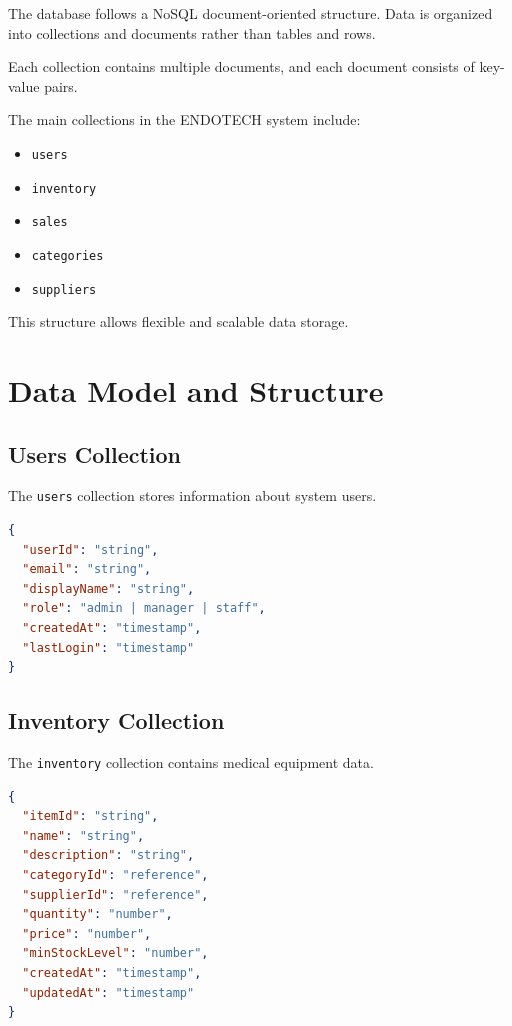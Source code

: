The database follows a NoSQL document-oriented structure. Data is organized into collections and documents rather than tables and rows.

Each collection contains multiple documents, and each document consists of key-value pairs.

The main collections in the ENDOTECH system include:

\begin{itemize}
    \item \texttt{users}
    \item \texttt{inventory}
    \item \texttt{sales}
    \item \texttt{categories}
    \item \texttt{suppliers}
\end{itemize}

This structure allows flexible and scalable data storage.

\section{Data Model and Structure}

\subsection{Users Collection}

The \texttt{users} collection stores information about system users.

\begin{lstlisting}[language=JSON, caption=User Document Structure]
{
  "userId": "string",
  "email": "string",
  "displayName": "string",
  "role": "admin | manager | staff",
  "createdAt": "timestamp",
  "lastLogin": "timestamp"
}
\end{lstlisting}

\subsection{Inventory Collection}

The \texttt{inventory} collection contains medical equipment data.

\begin{lstlisting}[language=JSON, caption=Inventory Document Structure]
{
  "itemId": "string",
  "name": "string",
  "description": "string",
  "categoryId": "reference",
  "supplierId": "reference",
  "quantity": "number",
  "price": "number",
  "minStockLevel": "number",
  "createdAt": "timestamp",
  "updatedAt": "timestamp"
}
\end{lstlisting}

